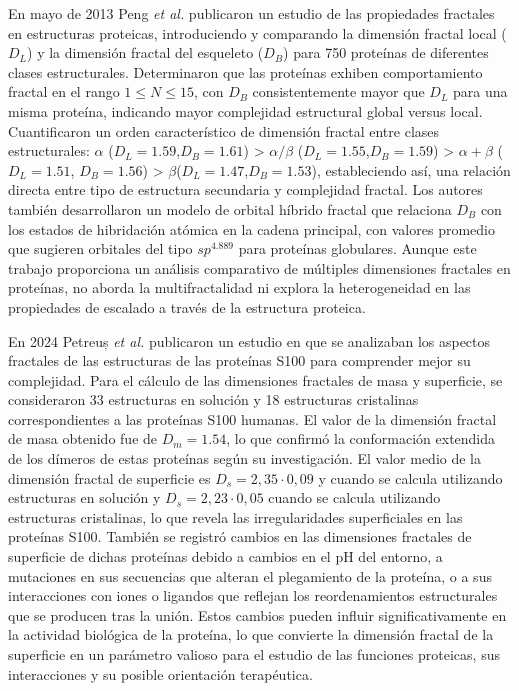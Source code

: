 En mayo de 2013 Peng \textit{et al.}\cite{Peng2013} publicaron un estudio de las propiedades fractales en estructuras proteicas, introduciendo y comparando la dimensión fractal local ($D_L$) y la dimensión fractal del esqueleto ($D_B$) para 750 proteínas de diferentes clases estructurales. Determinaron que las proteínas exhiben comportamiento fractal en el rango $1 \leq N \leq 15$, con $D_B$ consistentemente mayor que $D_L$ para una misma proteína, indicando mayor complejidad estructural global versus local. Cuantificaron un orden característico de dimensión fractal entre clases estructurales: $\alpha$ ($D_L = 1.59$,$D_B = 1.61$) > $\alpha/\beta$ ($D_L = 1.55$,$D_B = 1.59$) > $\alpha+\beta$ ($D_L = 1.51$, $D_B = 1.56$) > $\beta$($D_L = 1.47$,$D_B = 1.53$), estableciendo así, una relación directa entre tipo de estructura secundaria y complejidad fractal. Los autores también desarrollaron un modelo de orbital híbrido fractal que relaciona $D_B$ con los estados de hibridación atómica en la cadena principal, con valores promedio que sugieren orbitales del tipo $sp^{4.889}$ para proteínas globulares. Aunque este trabajo proporciona un análisis comparativo de múltiples dimensiones fractales en proteínas, no aborda la multifractalidad ni explora la heterogeneidad en las propiedades de escalado a través de la estructura proteica. 


En 2024 Petreuș \textit{et al.} \cite{Petreus2024} publicaron un estudio en que se analizaban los aspectos fractales de las estructuras de las prote\'{i}nas S100 para comprender mejor su complejidad. Para el c\'{a}lculo de las dimensiones fractales de masa y superficie, se consideraron 33 estructuras en soluci\'{o}n y 18 estructuras cristalinas correspondientes a las prote\'{i}nas S100 humanas. El valor de la dimensi\'{o}n fractal de masa obtenido fue de $D_m = 1.54$, lo que confirm\'{o} la conformaci\'{o}n extendida de los d\'{i}meros de estas prote\'{i}nas seg\'{u}n su investigaci\'{o}n. El valor medio de la dimensi\'{o}n fractal de superficie es $D_s = 2,35 \cdot 0,09$ y cuando se calcula utilizando estructuras en soluci\'{o}n y $D_s = 2,23 \cdot 0,05$ cuando se calcula utilizando estructuras cristalinas, lo que revela las irregularidades superficiales en las prote\'{i}nas S100. También se registró cambios en las dimensiones fractales de superficie de dichas prote\'{i}nas debido a cambios en el pH del entorno, a mutaciones en sus secuencias que alteran el plegamiento de la prote\'{i}na, o a sus interacciones con iones o ligandos que reflejan los reordenamientos estructurales que se producen tras la uni\'{o}n. Estos cambios pueden influir significativamente en la actividad biol\'{o}gica de la prote\'{i}na, lo que convierte la dimensi\'{o}n fractal de la superficie en un par\'{a}metro valioso para el estudio de las funciones proteicas, sus interacciones y su posible orientaci\'{o}n terap\'{e}utica.

